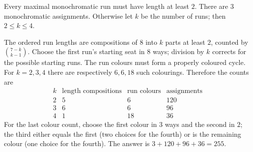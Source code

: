 Every maximal monochromatic run must have length at least $2$. There are $3$ monochromatic assignments. Otherwise let $k$ be the number of runs; then $2\le k\le4$.

The ordered run lengths are compositions of $8$ into $k$ parts at least $2$, counted by $\binom{7-k}{k-1}$. Choose the first run's starting seat in $8$ ways; division by $k$ corrects for the possible starting runs. The run colours must form a properly coloured cycle. For $k=2,3,4$ there are respectively $6,6,18$ such colourings. Therefore the counts are
\[
\begin{array}{c|c|c|c}
k&\text{length compositions}&\text{run colours}&\text{assignments}\\\hline
2&5&6&120\\
3&6&6&96\\
4&1&18&36
\end{array}
\]
For the last colour count, choose the first colour in $3$ ways and the second in $2$; the third either equals the first (two choices for the fourth) or is the remaining colour (one choice for the fourth). The answer is $\boxed{3+120+96+36=255}$.
